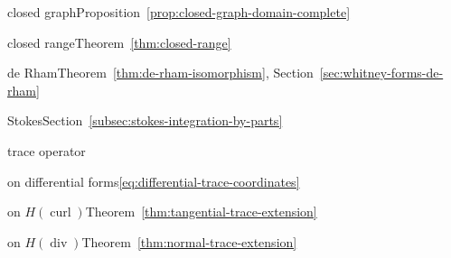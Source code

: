 \par\noindent\hspace*{1em}\label{index:theorem-closed-graph}{closed graph}\quad Proposition~\ref{prop:closed-graph-domain-complete}

\par\noindent\hspace*{1em}\label{index:theorem-closed-range}{closed range}\quad Theorem~\ref{thm:closed-range}

\par\noindent\hspace*{1em}\label{index:theorem-de-rham}{de Rham}\quad Theorem~\ref{thm:de-rham-isomorphism}, Section~\ref{sec:whitney-forms-de-rham}

\par\noindent\hspace*{1em}\label{index:theorem-stokes}{Stokes}\quad Section~\ref{subsec:stokes-integration-by-parts}

\par\noindent\hspace*{0em}\label{index:trace-operator}{trace operator}

\par\noindent\hspace*{1em}\label{index:trace-operator-on-differential-forms}{on differential forms}\quad \eqref{eq:differential-trace-coordinates}

\par\noindent\hspace*{1em}\label{index:trace-operator-on-h-operatorname-curl}{on $H(\operatorname{curl})$}\quad Theorem~\ref{thm:tangential-trace-extension}

\par\noindent\hspace*{1em}\label{index:trace-operator-on-h-operatorname-div}{on $H(\operatorname{div})$}\quad Theorem~\ref{thm:normal-trace-extension}

